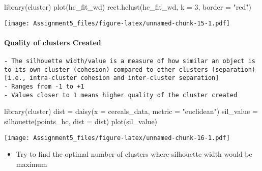 \documentclass[
]{article}
\newenvironment{Shaded}{\begin{snugshade}}{\end{snugshade}}
\newcommand{\AttributeTok}[1]{\textcolor[rgb]{0.77,0.63,0.00}{#1}}
\newcommand{\DecValTok}[1]{\textcolor[rgb]{0.00,0.00,0.81}{#1}}
\newcommand{\FunctionTok}[1]{\textcolor[rgb]{0.00,0.00,0.00}{#1}}
\newcommand{\NormalTok}[1]{#1}
\newcommand{\OtherTok}[1]{\textcolor[rgb]{0.56,0.35,0.01}{#1}}
\newcommand{\StringTok}[1]{\textcolor[rgb]{0.31,0.60,0.02}{#1}}
\providecommand{\tightlist}{%
  \setlength{\itemsep}{0pt}\setlength{\parskip}{0pt}}
\begin{document}
\begin{Shaded}
\begin{Highlighting}[]
\FunctionTok{library}\NormalTok{(cluster)}
\FunctionTok{plot}\NormalTok{(hc\_fit\_wd)}
\FunctionTok{rect.hclust}\NormalTok{(hc\_fit\_wd, }\AttributeTok{k =} \DecValTok{3}\NormalTok{, }\AttributeTok{border =} \StringTok{"red"}\NormalTok{)}
\end{Highlighting}
\end{Shaded}

\texttt{[image: Assignment5\_files/figure-latex/unnamed-chunk-15-1.pdf]}

\hypertarget{quality-of-clusters-created}{%
\paragraph{Quality of clusters
Created}\label{quality-of-clusters-created}}

\begin{verbatim}
- The silhouette width/value is a measure of how similar an object is to its own cluster (cohesion) compared to other clusters (separation)  [i.e., intra-cluster cohesion and inter-cluster separation]
- Ranges from -1 to +1  
- Values closer to 1 means higher quality of the cluster created 
\end{verbatim}

\begin{Shaded}
\begin{Highlighting}[]
\FunctionTok{library}\NormalTok{(cluster)}
\NormalTok{dist }\OtherTok{=} \FunctionTok{daisy}\NormalTok{(}\AttributeTok{x =}\NormalTok{ cereals\_data, }\AttributeTok{metric =} \StringTok{"euclidean"}\NormalTok{)}
\NormalTok{sil\_value }\OtherTok{=} \FunctionTok{silhouette}\NormalTok{(points\_hc, }\AttributeTok{dist =}\NormalTok{ dist)}
\FunctionTok{plot}\NormalTok{(sil\_value)}
\end{Highlighting}
\end{Shaded}

\texttt{[image: Assignment5\_files/figure-latex/unnamed-chunk-16-1.pdf]}

\begin{itemize}
\tightlist
\item
  Try to find the optimal number of clusters where silhouette width
  would be maximum
\end{itemize}
\end{document}
